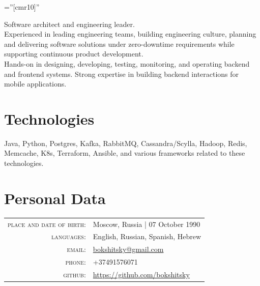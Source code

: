 \documentclass[a4paper,10pt]{article}
\begin{document}
\pagestyle{empty}

\font\fb=''[cmr10]''

\par{\bigskip\par}

Software architect and engineering leader.\\
Experienced in leading engineering teams, building engineering culture, planning and delivering software solutions under zero-downtime requirements while supporting continuous product development.\\
Hands-on in designing, developing, testing, monitoring, and operating backend and frontend systems. Strong expertise in building backend interactions for mobile applications.

\section{Technologies}
Java, Python, Postgres, Kafka, RabbitMQ, Cassandra/Scylla, Hadoop, Redis, Memcache, K8s, Terraform, Ansible, and various frameworks related to these technologies.


\section{Personal Data}
\begin{tabular}{rl}
  \textsc{place and date of birth:} & Moscow, Russia | 07 October 1990 \\
  \textsc{languages:} & English, Russian, Spanish, Hebrew \\
  \textsc{email:} & \href{mailto:bokshitsky@gmail.com}{bokshitsky@gmail.com} \\
  \textsc{phone:} & +37491576071 \\
  \textsc{github:} & \href{https://github.com/bokshitsky}{https://github.com/bokshitsky} \\
\end{tabular}
\end{document}
